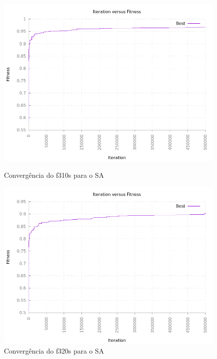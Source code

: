 \documentclass[12pt]{article}
\begin{document}
\begin{figure}[h!]
    \centering
    \begin{minipage}{0.45\textwidth}
        \centering
        \includegraphics[width=\textwidth]{pictures/saf310s}
        \caption{Convergência do f310s para o SA}
    \end{minipage}
    \begin{minipage}{0.45\textwidth}
        \centering
        \includegraphics[width=\textwidth]{pictures/saf320s}
        \caption{Convergência do f320s para o SA}
    \end{minipage}
\end{figure}
\end{document}
